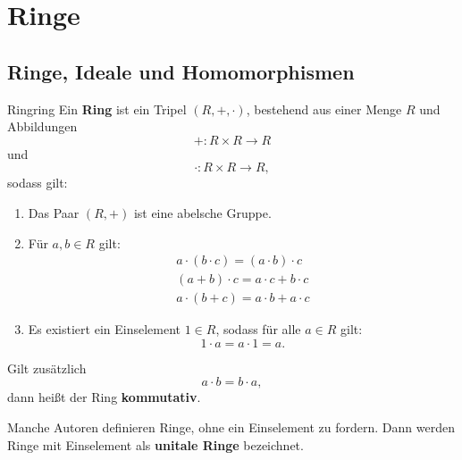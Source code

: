 \section{Ringe}
\label{sec:ringe}
\subsection{Ringe, Ideale und Homomorphismen}
\label{subsec:ringeidealehomo}
\begin{definition}{Ring}{ring}
Ein \textbf{Ring} ist ein Tripel $(R, +, \cdot)$, bestehend aus einer Menge $R$ und Abbildungen
\begin{equation}
+: R \times R \to R
\end{equation}
und
\begin{equation}
\cdot: R \times R \to R,
\end{equation}
sodass gilt:
\begin{enumerate}[({R}1)]
\item Das Paar $(R,+)$ ist eine abelsche Gruppe.
\item Für $a,b \in R$ gilt:
\begin{equation}
\begin{split}
a \cdot (b \cdot c) = (a \cdot b) \cdot c \\
(a+b) \cdot c = a\cdot c + b \cdot c \\
a \cdot (b+c) = a \cdot b + a \cdot c
\end{split}
\end{equation}
\item Es existiert ein Einselement $1 \in R$, sodass für alle $a \in R$ gilt:
\begin{equation}
1 \cdot a = a \cdot 1 = a.
\end{equation}
\end{enumerate}
Gilt zusätzlich 
\begin{equation}
a \cdot b = b \cdot a,
\end{equation}
dann heißt der Ring \textbf{kommutativ}.
\end{definition}
\begin{bemerkung}
Manche Autoren definieren Ringe, ohne ein Einselement zu fordern. Dann werden Ringe mit Einselement als \textbf{unitale Ringe} bezeichnet.
\end{bemerkung}
